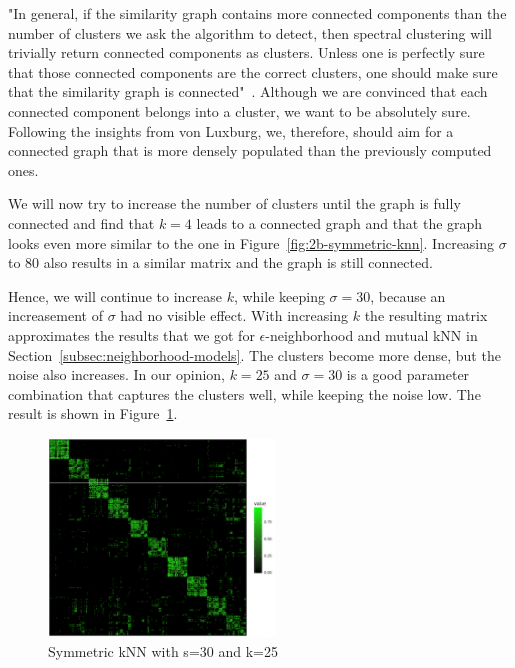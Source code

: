 \documentclass{support/acm_proc_article-sp}
\begin{document}
    "In general, if the similarity graph contains more connected components than the number of clusters we ask the
    algorithm to detect, then spectral clustering will trivially return connected components as clusters.
    Unless one is perfectly sure that those connected components are the correct clusters, one should make sure
    that the similarity graph is connected"~\cite[p.21]{Luxburg2007}.
    Although we are convinced that each connected component belongs into a cluster, we want to be absolutely sure.
    Following the insights from von Luxburg, we, therefore, should aim for a connected graph that is more
    densely populated than the previously computed ones.

    We will now try to increase the number of clusters until the graph is fully connected and
    find that $k = 4$ leads to a connected graph and that the graph looks even more similar to the one in
    Figure~\ref{fig:2b-symmetric-knn}.
    Increasing $\sigma$ to 80 also results in a similar matrix and the graph is still connected.

    Hence, we will continue to increase $k$, while keeping $\sigma = 30$, because an increasement of $\sigma$ had no
    visible effect.
    With increasing $k$ the resulting matrix approximates the results that we got for $\epsilon$-neighborhood and
    mutual kNN in Section~\ref{subsec:neighborhood-models}.
    The clusters become more dense, but the noise also increases.
    In our opinion, $k = 25$ and $\sigma = 30$ is a good parameter combination that captures the clusters well, while
    keeping the noise low.
    The result is shown in Figure~\ref{fig:2c-s30-k25}.
    \begin{figure}[htbp]
        \centering
        \includegraphics[width=6cm]{images/2c-s30-k25.png}
        \caption{Symmetric kNN with s=30 and k=25}
        \label{fig:2c-s30-k25}
    \end{figure}

\end{document}
